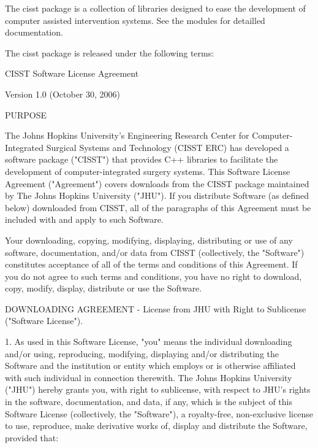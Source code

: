 The cisst package is a collection of libraries designed to ease the development of computer assisted intervention systems. See the modules for detailled documentation.

The cisst package is released under the following terms\-: 
\begin{DoxyPre}
CISST Software License Agreement\end{DoxyPre}



\begin{DoxyPre}Version 1.0 (October 30, 2006)\end{DoxyPre}



\begin{DoxyPre}PURPOSE\end{DoxyPre}



\begin{DoxyPre}The Johns Hopkins University's Engineering Research Center for
Computer-Integrated Surgical Systems and Technology (CISST ERC) has
developed a software package ("CISST") that provides C++ libraries to
facilitate the development of computer-integrated surgery systems.
This Software License Agreement ("Agreement") covers downloads from
the CISST package maintained by The Johns Hopkins University ("JHU").
If you distribute Software (as defined below) downloaded from CISST,
all of the paragraphs of this Agreement must be included with and
apply to such Software.\end{DoxyPre}



\begin{DoxyPre}Your downloading, copying, modifying, displaying, distributing or use
of any software, documentation, and/or data from CISST (collectively,
the "Software") constitutes acceptance of all of the terms and
conditions of this Agreement. If you do not agree to such terms and
conditions, you have no right to download, copy, modify, display,
distribute or use the Software.\end{DoxyPre}



\begin{DoxyPre}DOWNLOADING AGREEMENT - License from JHU with Right to Sublicense
("Software License").\end{DoxyPre}



\begin{DoxyPre}1. As used in this Software License, "you" means the individual
   downloading and/or using, reproducing, modifying, displaying and/or
   distributing the Software and the institution or entity which
   employs or is otherwise affiliated with such individual in
   connection therewith. The Johns Hopkins University ("JHU") hereby
   grants you, with right to sublicense, with respect to JHU's rights
   in the software, documentation, and data, if any, which is the
   subject of this Software License (collectively, the "Software"), a
   royalty-free, non-exclusive license to use, reproduce, make
   derivative works of, display and distribute the Software, provided
   that:\end{DoxyPre}



